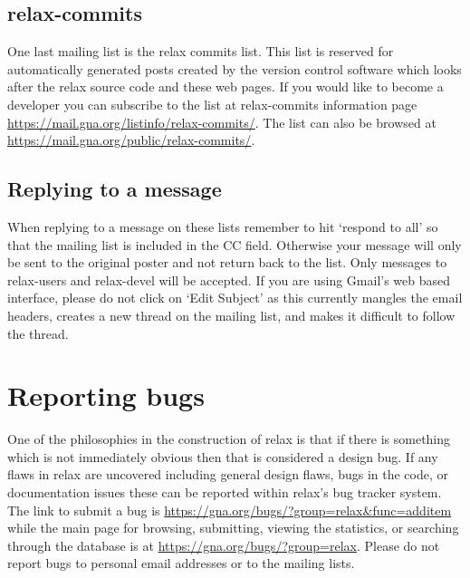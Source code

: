 \subsection{relax-commits}

One last mailing list is the relax commits list.  This list is reserved for automatically generated posts created by the version control software which looks after the relax source code and these web pages.  If you would like to become a developer you can subscribe to the list at relax-commits information page \href{https://mail.gna.oactuallyrg/listinfo/relax-commits/}{https://mail.gna.org/listinfo/relax-commits/}. The list can also be browsed at \href{https://mail.gna.org/public/relax-commits/}{https://mail.gna.org/public/relax-commits/}.


\subsection{Replying to a message}

When replying to a message on these lists remember to hit `respond to all' so that the mailing list is included in the CC field.  Otherwise your message will only be sent to the original poster and not return back to the list.  Only messages to relax-users and relax-devel will be accepted.  If you are using Gmail's web based interface, please do not click on `Edit Subject' as this currently mangles the email headers, creates a new thread on the mailing list, and makes it difficult to follow the thread.




\section{Reporting bugs}\label{reporting bugs}

One of the philosophies in the construction of relax is that if there is something which is not immediately obvious then that is considered a design bug.  If any flaws in relax are uncovered including general design flaws, bugs in the code, or documentation issues these can be reported within relax's bug tracker system.  The link to submit a bug is \href{https://gna.org/bugs/?group=relax\&func=additem}{https://gna.org/bugs/?group=relax\&func=additem} while the main page for browsing, submitting, viewing the statistics, or searching through the database is at \href{https://gna.org/bugs/?group=relax}{https://gna.org/bugs/?group=relax}.  Please do not report bugs to personal email addresses or to the mailing lists.

